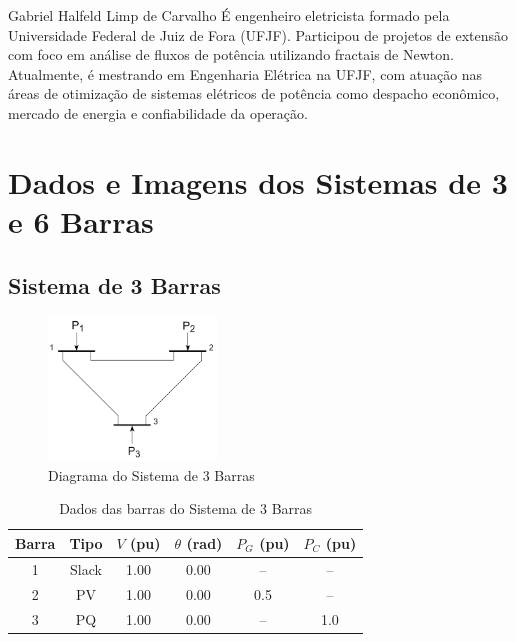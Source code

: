 \documentclass[journal]{IEEEtran}
\begin{document}
\begin{IEEEbiography}{Gabriel Halfeld Limp de Carvalho}
É engenheiro eletricista formado pela Universidade Federal de Juiz de Fora (UFJF). Participou de projetos de extensão com foco em análise de fluxos de potência utilizando fractais de Newton. Atualmente, é mestrando em Engenharia Elétrica na UFJF, com atuação nas áreas de otimização de sistemas elétricos de potência como despacho econômico, mercado de energia e confiabilidade da operação.


\end{IEEEbiography}


\vfill
\clearpage
\appendix
\section{Dados e Imagens dos Sistemas de 3 e 6 Barras}

\subsection{Sistema de 3 Barras}
\begin{figure}[h!]
  \centering
  \includegraphics[width=0.4\textwidth]{../images/3_bus.png}
  \caption{Diagrama do Sistema de 3 Barras}
\end{figure}

\begin{table}[h!]
\centering
\caption{Dados das barras do Sistema de 3 Barras}
\label{tab:3bus_barras}
\begin{tabular}{c|c|c|c|c|c}
\hline
Barra & Tipo  & $V$ (pu) & $\theta$ (rad) & $P_{G}$ (pu) & $P_{C}$ (pu) \\
\hline
1 & Slack & 1.00 & 0.00 & --   & --   \\
2 & PV    & 1.00 & 0.00 & 0.5  & --   \\
3 & PQ    & 1.00 & 0.00 & --   & 1.0  \\
\hline
\end{tabular}
\end{table}
\end{document}
